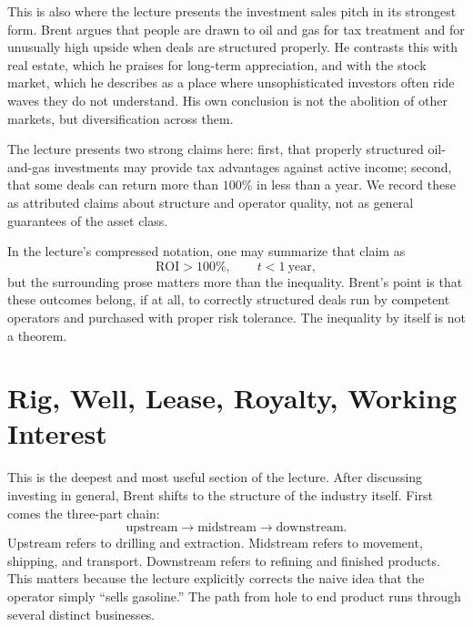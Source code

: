 This is also where the lecture presents the investment sales pitch in its strongest form. Brent argues that people are drawn to oil and gas for tax treatment and for unusually high upside when deals are structured properly. He contrasts this with real estate, which he praises for long-term appreciation, and with the stock market, which he describes as a place where unsophisticated investors often ride waves they do not understand. His own conclusion is not the abolition of other markets, but diversification across them.

\begin{remark}
The lecture presents two strong claims here: first, that properly structured oil-and-gas investments may provide tax advantages against active income; second, that some deals can return more than \(100\%\) in less than a year. We record these as attributed claims about structure and operator quality, not as general guarantees of the asset class.
\end{remark}

In the lecture's compressed notation, one may summarize that claim as
\begin{equation}
\mathrm{ROI} > 100\%, \qquad t < 1\ \mathrm{year},
\end{equation}
but the surrounding prose matters more than the inequality. Brent's point is that these outcomes belong, if at all, to correctly structured deals run by competent operators and purchased with proper risk tolerance. The inequality by itself is not a theorem.

\section{Rig, Well, Lease, Royalty, Working Interest}

This is the deepest and most useful section of the lecture. After discussing investing in general, Brent shifts to the structure of the industry itself. First comes the three-part chain:
\begin{equation}
\text{upstream} \longrightarrow \text{midstream} \longrightarrow \text{downstream}.
\end{equation}
Upstream refers to drilling and extraction. Midstream refers to movement, shipping, and transport. Downstream refers to refining and finished products. This matters because the lecture explicitly corrects the naive idea that the operator simply ``sells gasoline.'' The path from hole to end product runs through several distinct businesses.

